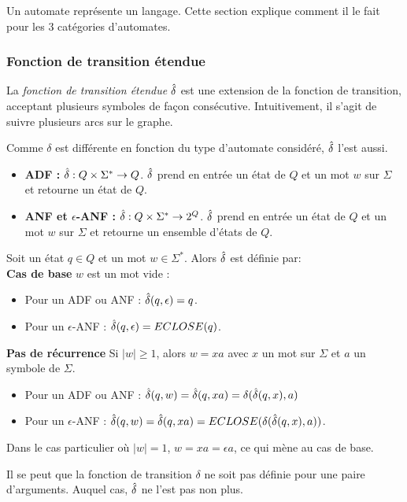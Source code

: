 Un automate représente un langage. Cette section explique comment il le fait pour les 3 catégories d'automates.

\subsubsection*{Fonction de transition étendue}

La \emph{fonction de transition étendue} $\hat{\delta}$ est une extension de la fonction de transition, acceptant plusieurs symboles de façon consécutive. Intuitivement, il s'agit de suivre plusieurs arcs sur le graphe.

Comme $\delta$ est différente en fonction du type d'automate considéré, $\hat{\delta}$ l'est aussi.

\begin{itemize}
  \item \textbf{ADF :} $\hat{\delta} : Q \times \Sigma^* \rightarrow Q$. $\hat{\delta}$ prend en entrée un état de $Q$ et un mot $w$ sur $\Sigma$ et retourne un état de $Q$.
  \item \textbf{ANF et $\epsilon$-ANF :} $\hat{\delta} : Q \times \Sigma^* \rightarrow 2^Q$. $\hat{\delta}$ prend en entrée un état de $Q$ et un mot $w$ sur $\Sigma$ et retourne un ensemble d'états de $Q$.
\end{itemize}

Soit un état $q \in Q$ et un mot $w \in \Sigma^*$. Alors $\hat{\delta}$ est définie par:\\
\textbf{Cas de base} $w$ est un mot vide :
  \begin{itemize}
    \item Pour un ADF ou ANF : $\hat{\delta}(q, \epsilon) = q$.
    \item Pour un $\epsilon$-ANF : $\hat{\delta}(q, \epsilon) = ECLOSE(q)$.
  \end{itemize}
\textbf{Pas de récurrence} Si $|w|\ge 1$, alors $w=xa$ avec $x$ un mot sur $\Sigma$ et $a$ un symbole de $\Sigma$.
\begin{itemize}
  \item Pour un ADF ou ANF : $\hat{\delta}(q,w) = \hat{\delta}(q,xa)= \delta(\hat{\delta}(q,x),a)$
  \item Pour un $\epsilon$-ANF : $\hat{\delta}(q,w) = \hat{\delta}(q,xa)= ECLOSE(\delta(\hat{\delta}(q,x),a))$.
\end{itemize}
Dans le cas particulier où $|w|=1$, $w=xa=\epsilon a$, ce qui mène au cas de base.

Il se peut que la fonction de transition $\delta$ ne soit pas définie pour une paire d'arguments. Auquel cas, $\hat{\delta}$ ne l'est pas non plus.\\

